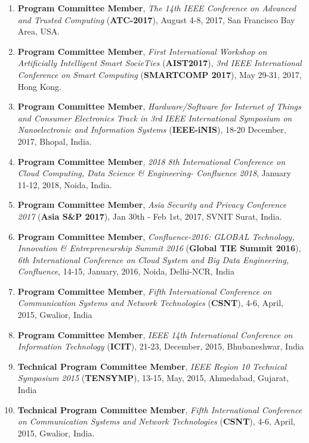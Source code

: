 \begin{enumerate} [label=(\arabic*).]
\item
\textbf{Program Committee Member}, \textit{The 14th IEEE Conference on Advanced and Trusted Computing} (\textbf{ATC-2017}), August 4-8, 2017, San Francisco Bay Area, USA.

\item
\textbf{Program Committee Member}, \textit{First International Workshop on Artificially Intelligent Smart SocieTies} (\textbf{AIST2017}), \textit{3rd IEEE International Conference on Smart Computing} (\textbf{SMARTCOMP 2017}), May 29-31, 2017, Hong Kong.

\item
\textbf{Program Committee Member},\textit{ Hardware/Software for Internet of Things and Consumer Electronics Track in 3rd IEEE International Symposium on Nanoelectronic and Information Systems} (\textbf{IEEE-iNIS}), 18-20 December, 2017, Bhopal, India.

\item
\textbf{Program Committee Member}, \textit{2018 8th International Conference on Cloud Computing, Data Science \& Engineering- Confluence 2018}, January 11-12, 2018, Noida, India.

\item
\textbf{Program Committee Member}, \textit{Asia Security and Privacy Conference 2017} (\textbf{Asia S\&P 2017}), Jan 30th - Feb 1st, 2017, SVNIT Surat, India.

\item
\textbf{Program Committee Member},  \textit{Confluence-2016: GLOBAL Technology, Innovation \& Entrepreneurship Summit 2016 }(\textbf{Global TIE Summit 2016}),\textit{ 6th International Conference on Cloud System and Big Data Engineering, Confluence}, 14-15, January, 2016, Noida, Delhi-NCR, India

\item
\textbf{Program Committee Member},  \textit{Fifth International Conference on Communication Systems and Network Technologies }(\textbf{CSNT}), 4-6, April, 2015, Gwalior, India

\item
\textbf{Program Committee Member}, \textit{IEEE 14th International Conference on Information Technology} (\textbf{ICIT}), 21-23, December, 2015, Bhubaneshwar, India

\item
\textbf{Technical Program Committee Member}, \textit{IEEE Region 10 Technical Symposium 2015} (\textbf{TENSYMP}), 13-15, May, 2015, Ahmedabad, Gujarat, India

\item
\textbf{Technical Program Committee Member}, \textit{Fifth International Conference on Communication Systems and Network Technologies} (\textbf{CSNT}), 4-6, April, 2015, Gwalior, India.


\end{enumerate}
